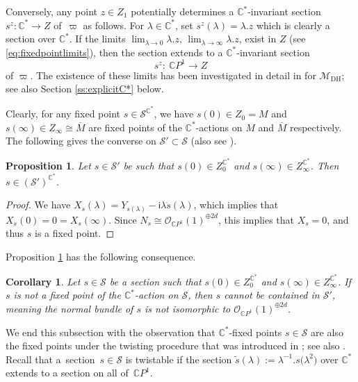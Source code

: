\documentclass[pdftex]{sigma}
\numberwithin{equation}{section}
\newtheorem{Corollary}[Theorem]{Corollary}
\newtheorem{Proposition}[Theorem]{Proposition}
\theoremstyle{definition}
\newcommand\C{{\mathbb C}}
\renewcommand{\i}{\mathsf{i}}
\begin{document}
Conversely, any point $z \in Z_{1}$ potentially determines a $\C^*$-invariant section $s^z \colon \C^*
 \longrightarrow Z$ of~$\varpi$ as follows.
For $\lambda \in \C^*$, set
$%
s^z(\lambda) = \lambda.z
$
which is clearly a section over $\C^*$.
If the limits
$
\lim_{\lambda\to 0}\lambda.z$, $ \lim_{\lambda\to\infty}\lambda.z$,
exist in $Z$ (see \eqref{eq:fixedpointlimits}), then the section extends to a $\C^*$-invariant
section
\[s^z\colon\ \C P^1 \longrightarrow Z\]
 of $\varpi$. The existence of these limits has been investigated
in detail in \cite{Simpson-iterated} for $\mathcal{M}_{\mathrm{DH}}$; see
also Section \ref{ss:explicitC*} below.

Clearly, for any fixed point $s \in \mathcal S^{\C^*}$, we have $s(0) \in Z_0 = M$ and $s(\infty)
 \in Z_\infty \cong \overline{M}$ are fixed points of the $\C^*$-actions on $M$ and $\overline{M}$ respectively.
The following gives the converse on $\mathcal{S}' \subset \mathcal{S}$ (also see \cite{Fei01,Fei02,Fei03}).

\begin{Proposition}\label{prp1}
Let $s \in \mathcal S'$ be such that $s(0) \in Z_0^{\C^*}$ and $s(\infty) \in Z_\infty^{\C^*}$. Then
$s \in (\mathcal S')^{\C^*}$.
\end{Proposition}

\begin{proof}
We have $X_s(\lambda) = Y_{s(\lambda)} - \i \lambda\dot{s}(\lambda)$, which implies that $X_s(0) = 0 = X_s(\infty)$.
Since $N_s \cong \mathcal{O}_{\C P^1}(1)^{\oplus 2d}$, this implies that $X_s = 0$, and thus $s$ is a fixed point.
\end{proof}

Proposition \ref{prp1} has the following consequence.

\begin{Corollary}
Let $s \in \mathcal S$ be a section such that $s(0) \in Z_0^{\C^*}$ and $s(\infty) \in Z_\infty^{\C^*}$.
If $s$ is not a fixed point of the $\C^*$-action on $\mathcal S$, then $s$ cannot be contained in $\mathcal S'$, meaning
the normal bundle of $s$ is not isomorphic to $\mathcal{O}_{\C P^1}(1)^{\oplus 2d}$.
\end{Corollary}

We end this subsection with the observation that $\C^*$-fixed points $s \in \mathcal S$ are also
the fixed points under the twisting procedure that was introduced in \cite{BeHeRo}; see also \cite{BHR}.
Recall that a~section~$s\in \mathcal{S}$ is twistable if the section $\widetilde{s}(\lambda) := \lambda^{-1}.s\bigl(\lambda^2\bigr)$ over $\C^*$ extends to a section on all of~$\mathbb CP^1$.
\end{document}
